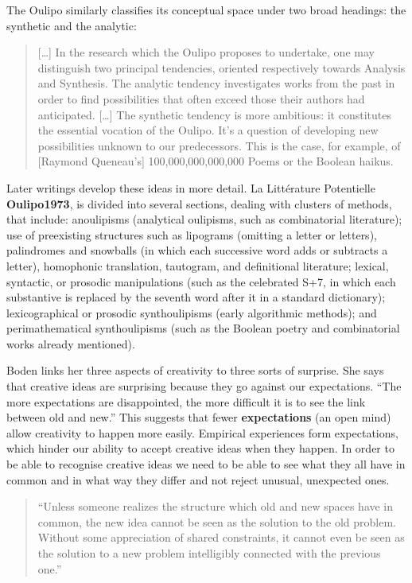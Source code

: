 The Oulipo similarly classifies its conceptual space under two broad headings: the synthetic and the analytic:

\begin{quote}
  […] In the research which the Oulipo proposes to undertake, one may distinguish two principal tendencies, oriented respectively towards Analysis and Synthesis. The analytic tendency investigates works from the past in order to find possibilities that often exceed those their authors had anticipated. […] The synthetic tendency is more ambitious: it constitutes the essential vocation of the Oulipo. It's a question of developing new possibilities unknown to our predecessors. This is the case, for example, of [Raymond Queneau's] 100,000,000,000,000 Poems or the Boolean haikus. \autocite[p.27]{Motte2007}
\end{quote}

Later writings develop these ideas in more detail. La Littérature Potentielle \textbf{Oulipo1973}, is divided into several sections, dealing with clusters of methods, that include: anoulipisms (analytical oulipisms, such as combinatorial literature); use of preexisting structures such as lipograms (omitting a letter or letters), palindromes and snowballs (in which each successive word adds or subtracts a letter), homophonic translation, tautogram, and definitional literature; lexical, syntactic, or prosodic manipulations (such as the celebrated S+7, in which each substantive is replaced by the seventh word after it in a standard dictionary); lexicographical or prosodic synthoulipisms (early algorithmic methods); and perimathematical synthoulipisms (such as the Boolean poetry and combinatorial works already mentioned).

Boden links her three aspects of creativity to three sorts of surprise. She says that creative ideas are surprising because they go against our expectations. ``The more expectations are disappointed, the more difficult it is to see the link between old and new.'' \autocite[p.84]{Boden2003} This suggests that fewer \textbf{expectations} (an open mind) allow creativity to happen more easily. Empirical experiences form expectations, which hinder our ability to accept creative ideas when they happen. In order to be able to recognise creative ideas we need to be able to see what they all have in common and in what way they differ and not reject unusual, unexpected ones.

\begin{quote}
  ``Unless someone realizes the structure which old and new spaces have in common, the new idea cannot be seen as the solution to the old problem. Without some appreciation of shared constraints, it cannot even be seen as the solution to a new problem intelligibly connected with the previous one.'' \autocite[p.84]{Boden2003}
\end{quote}

